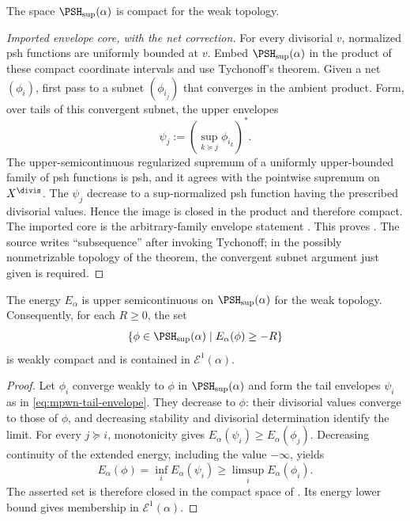 \begin{theorem}\label{thm:mpwn-weak-compactness}
The space $\PSH_{\sup}(\alpha)$ is compact for the weak topology.
\end{theorem}

\begin{proof}[Imported envelope core, with the net correction]
For every divisorial $v$, normalized psh functions are uniformly bounded
at $v$.  Embed $\PSH_{\sup}(\alpha)$ in the product of these compact
coordinate intervals and use Tychonoff's theorem.  Given a net
$(\phi_i)$, first pass to a subnet $(\phi_{i_j})$ that converges in the
ambient product.  Form, over tails of this convergent subnet, the upper
envelopes
\[
              \psi_j:=\left(\sup_{k\succeq j}\phi_{i_k}\right)^* .
\tag{61.3}\label{eq:mpwn-tail-envelope}
\]
The upper-semicontinuous regularized supremum of a uniformly
upper-bounded family of psh functions is psh, and it agrees with the
pointwise supremum on $X^{\divis}$.  The $\psi_j$ decrease to a
sup-normalized psh function having the prescribed divisorial values.
Hence the image is closed in the product and therefore compact.
The imported core is the arbitrary-family envelope statement
\cite[Proposition~3.1.2]{MPWN25}.  This proves
\cite[Theorem~3.1.1]{MPWN25}.  The source writes ``subsequence'' after
invoking Tychonoff; in the possibly nonmetrizable topology of the theorem,
the convergent subnet argument just given is required.
\end{proof}

\begin{lemma}\label{lem:mpwn-energy-weak-upper}
The energy $E_\alpha$ is upper semicontinuous on
$\PSH_{\sup}(\alpha)$ for the weak topology.  Consequently, for
each $R\geq0$, the set
\[
 \{\phi\in\PSH_{\sup}(\alpha)\mid E_\alpha(\phi)\geq-R\}
\]
is weakly compact and is contained in $\mathcal E^1(\alpha)$.
\end{lemma}

\begin{proof}
Let $\phi_i$ converge weakly to $\phi$ in $\PSH_{\sup}(\alpha)$
and form the tail envelopes $\psi_i$ as in
\eqref{eq:mpwn-tail-envelope}.  They decrease to $\phi$:
their divisorial values converge to those of $\phi$, and
decreasing stability and divisorial determination identify the
limit.  For every $j\succeq i$, monotonicity gives
$E_\alpha(\psi_i)\geq E_\alpha(\phi_j)$.  Decreasing continuity
of the extended energy, including the value $-\infty$, yields
\[
 E_\alpha(\phi)=\inf_i E_\alpha(\psi_i)
                 \geq\limsup_i E_\alpha(\phi_i).
\]
The asserted set is therefore closed in the compact space of
.  Its energy lower bound gives
membership in $\mathcal E^1(\alpha)$.
\end{proof}


